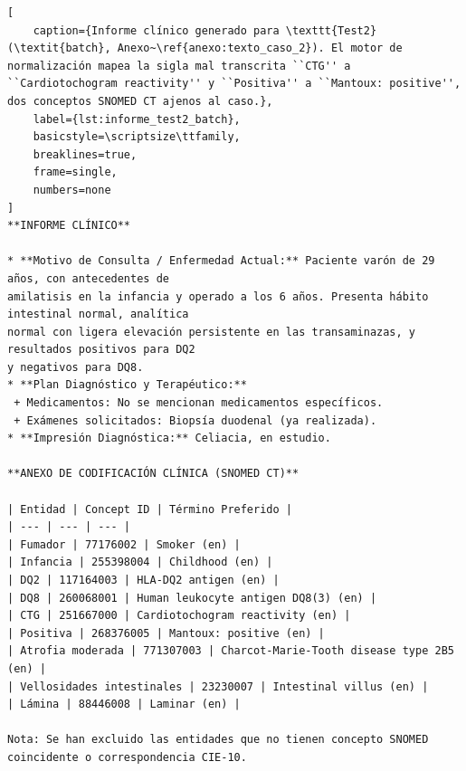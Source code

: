 \begin{lstlisting}[
    caption={Informe clínico generado para \texttt{Test2} (\textit{batch}, Anexo~\ref{anexo:texto_caso_2}). El motor de normalización mapea la sigla mal transcrita ``CTG'' a ``Cardiotochogram reactivity'' y ``Positiva'' a ``Mantoux: positive'', dos conceptos SNOMED CT ajenos al caso.},
    label={lst:informe_test2_batch},
    basicstyle=\scriptsize\ttfamily,
    breaklines=true,
    frame=single,
    numbers=none
]
**INFORME CLÍNICO**

* **Motivo de Consulta / Enfermedad Actual:** Paciente varón de 29 años, con antecedentes de
amilatisis en la infancia y operado a los 6 años. Presenta hábito intestinal normal, analítica
normal con ligera elevación persistente en las transaminazas, y resultados positivos para DQ2
y negativos para DQ8.
* **Plan Diagnóstico y Terapéutico:**
 + Medicamentos: No se mencionan medicamentos específicos.
 + Exámenes solicitados: Biopsía duodenal (ya realizada).
* **Impresión Diagnóstica:** Celiacia, en estudio.

**ANEXO DE CODIFICACIÓN CLÍNICA (SNOMED CT)**

| Entidad | Concept ID | Término Preferido |
| --- | --- | --- |
| Fumador | 77176002 | Smoker (en) |
| Infancia | 255398004 | Childhood (en) |
| DQ2 | 117164003 | HLA-DQ2 antigen (en) |
| DQ8 | 260068001 | Human leukocyte antigen DQ8(3) (en) |
| CTG | 251667000 | Cardiotochogram reactivity (en) |
| Positiva | 268376005 | Mantoux: positive (en) |
| Atrofia moderada | 771307003 | Charcot-Marie-Tooth disease type 2B5 (en) |
| Vellosidades intestinales | 23230007 | Intestinal villus (en) |
| Lámina | 88446008 | Laminar (en) |

Nota: Se han excluido las entidades que no tienen concepto SNOMED coincidente o correspondencia CIE-10.
\end{lstlisting}

